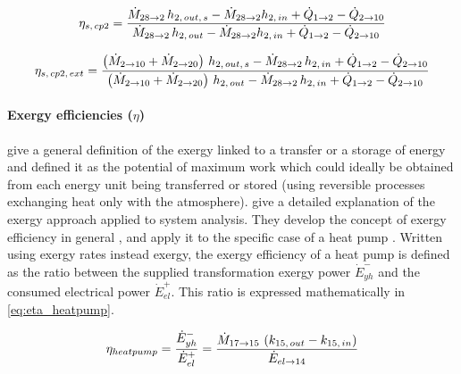 \begin{equation}
  \label{eq:eps_cp2_s}
  \eta_{s,\,cp2} = \dfrac{\dotM{28}{2} \, h_{2,\,out,\,s} - \dotM{28}{2}
    h_{2,\,in} + \dot{Q}_{1 \rightarrow 2} - \dot{Q}_{2 \rightarrow
      10}}{\dotM{28}{2} \, h_{2,\,out} - \dotM{28}{2} h_{2,\,in} +
    \dot{Q}_{1 \rightarrow 2} - \dot{Q}_{2 \rightarrow 10}}
  \tagaddtextone{$\left[-\right]$}
\end{equation}

\begin{equation}
  \label{eq:eps_cp2_s_ext}
  \eta_{s,\,cp2,\,ext} = \dfrac{\left( \dotM{2}{10} + \dotM{2}{20}
    \right) \, h_{2,\,out,\,s} - \dotM{28}{2} \, h_{2,\,in} +
    \dot{Q}_{1 \rightarrow 2} - \dot{Q}_{2 \rightarrow 10}}{\left(
      \dotM{2}{10} + \dotM{2}{20} \right) \, h_{2,\,out} -
    \dotM{28}{2} \, h_{2,\,in} + \dot{Q}_{1 \rightarrow 2} -
    \dot{Q}_{2 \rightarrow 10}}
  \tagaddtexttwo{$\left[-\right]$}
\end{equation}

\paragraph{Exergy efficiencies ($\eta$)}

\citet[based on def.~p.\,2]{Favrat-Epelly-2008a} give a general
definition of the exergy linked to a transfer or a storage of energy
and defined it as the potential of maximum work which could ideally be
obtained from each energy unit being transferred or stored (using
reversible processes exchanging heat only with the
atmosphere). \citet[p.\,406--448]{Borel-Favrat-2010a} give a detailed
explanation of the exergy approach applied to system analysis. They
develop the concept of exergy efficiency in general
\citep[p.\,447--448]{Borel-Favrat-2010a}, and apply it to the specific
case of a heat pump \citep[p.\,642]{Borel-Favrat-2010a}. Written using
exergy rates instead exergy, the exergy efficiency of a heat pump is
defined as the ratio between the supplied transformation exergy power
$\dot{E}^-_{yh}$ and the consumed electrical power
$\dot{E}^+_{el}$. This ratio is expressed mathematically in
\cref{eq:eta_heatpump}.

\begin{equation}
  \label{eq:eta_heatpump}
  \eta_{heatpump} = \dfrac{\dot{E}^-_{yh}}{\dot{E}^+_{el}} =
  \dfrac{\dotM{17}{15} \, \left( k_{15,\,out} - k_{15,\,in} \right)}
  {\dotE{el}{14}}
  \tagaddtexttwo{$\left[-\right]$}
\end{equation}


